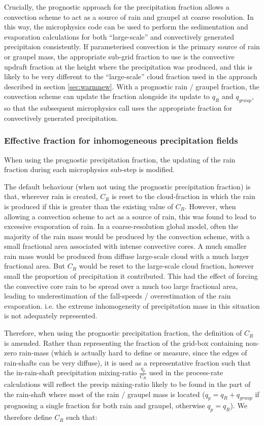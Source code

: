 \documentclass{UMDP_article}
\begin{document}
Crucially, the prognostic approach for the precipitation fraction
allows a convection scheme to act as a source of rain and graupel
at coarse resolution.  In this way, the microphysics code can be used
to perform the sedimentation and evaporation calculations for both
``large-scale'' and convectively generated precipitaion consistently.
If parameterised convection is the primary source
of rain or graupel mass, the appropriate sub-grid fraction to use is the
convective updraft fraction at the height where the precipitation was
produced, and this is likely to be very different to the ``large-scale''
cloud fraction used in the approach described in section \ref{sec:warmnew}.
With a prognostic rain / graupel fraction, the convection scheme can update
the fraction alongside its update to $q_R$ and $q_{graup}$, so that the
subsequent microphysics call uses the appropriate fraction
for convectively generated precipitation.

\subsubsection{Effective fraction for inhomogeneous precipitation fields}

When using the prognostic precipitation fraction, the updating of the
rain fraction during each microphysics sub-step is modified.

The default behaviour (when not using the prognostic precipitation fraction)
is that, wherever rain is created, $C_R$ is reset to the cloud-fraction
in which the rain is produced if this is greater than the existing value
of $C_R$.  However, when allowing a convection scheme to act as a source of
rain, this was found to lead to excessive evaporation of rain.
In a coarse-resolution global model, often
the majority of the rain mass would be produced by the convection scheme,
with a small fractional area associated with intense convective cores.
A much smaller rain mass would be produced from diffuse large-scale cloud
with a much larger fractional area.
But $C_R$ would be reset to the large-scale cloud fraction, however small
the proportion of precipitation it contributed.  This had the effect of forcing
the convective core rain to be spread over a much too large fractional area,
leading to underestimation of the fall-speeds / overestimation of the
rain evaporation.
i.e. the extreme inhomogeneity of precipitation mass in this situation is
not adequately represented.

Therefore, when using the prognostic precipitation fraction, the
definition of $C_R$ is amended.  Rather than representing the fraction
of the grid-box containing non-zero rain-mass
(which is actually hard to define or measure, since the edges of rain-shafts
can be very diffuse), it is used as a representative
fraction such that the in-rain-shaft precipitation mixing-ratio
$\frac{q_p}{C_R}$
used in the process-rate calculations will reflect the precip mixing-ratio
likely to be found in the part of the rain-shaft where most of the rain /
graupel mass is located
($q_p = q_R + q_{graup}$ if prognosing a single fraction for both rain and
graupel, otherwise $q_p = q_R$).
We therefore define $C_R$ such that:
\end{document}
